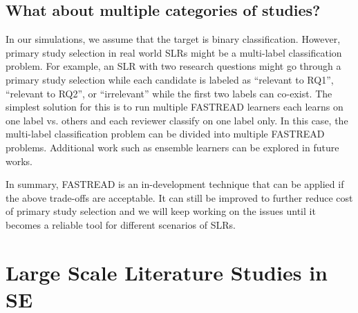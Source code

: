 \documentclass{svjour3}
\theoremstyle{break}
\begin{document}
\subsection{What about multiple categories of studies?}

In our simulations, we assume that the target is binary classification. However, primary study selection in real world SLRs might be a multi-label classification problem. For example, an SLR with two research questions might go through a primary study selection while each candidate is labeled as ``relevant to RQ1'', ``relevant to RQ2'', or ``irrelevant'' while the first two labels can co-exist. The simplest solution for this is to run multiple FASTREAD learners each learns on one label vs. others and each reviewer classify on one label only. In this case, the multi-label classification problem can be divided into multiple FASTREAD problems. Additional work such as ensemble learners can be explored in future works.

In summary, FASTREAD is an in-development technique that can be applied if the above trade-offs are acceptable. It can still be improved to further reduce cost of primary study selection and we will keep working on the issues until it becomes a reliable tool for different scenarios of SLRs.

























\section{Large Scale Literature Studies in SE}
\label{sect: Background}
\end{document}

